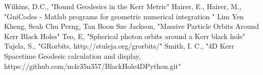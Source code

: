 \documentclass[11pt]{article}
\begin{document}
\begin{thebibliography}{1}
 Wilkins, D.C., "Bound Geodesics in the Kerr Metric"
  Hairer, E., Hairer, M., "GniCodes - Matlab programs for geometric numerical integration "
 Lim Yen Kheng, Seah Chu Perng, Tan Boon Sze Jackson, "Massive Particle Orbits Around Kerr Black Holes"
 Teo, E, "Spherical photon orbits around a Kerr black hole"
 Tujela, S., "GRorbits, http://stuleja.org/grorbits/"
 Smith, I. C., "4D Kerr Spacetime Geodesic calculation and display, https://github.com/m4r35n357/BlackHole4DPython.git"
\end{thebibliography}
\end{document}
